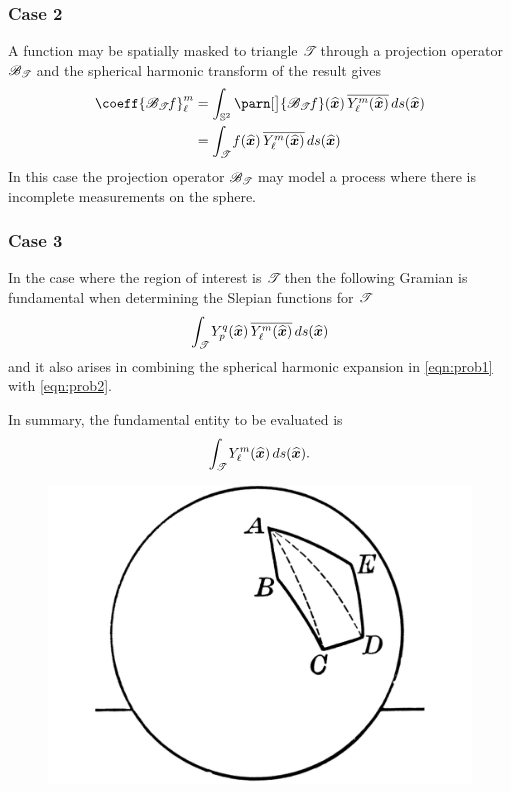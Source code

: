 \documentclass[10pt, twocolumn, twoside]{IEEEtran}
\newcommand{\untsph}{\mathbb{S}^{2}} %
\newcommand{\unit}[1]{\widehat{\bm{#1}}}
\newcommand{\conj}[1]{\overline{#1}} %
\begin{document}
\begin{bibunit}
\subsubsection{Case 2} A function may be spatially masked to triangle $\mathscr{T}\!$ through a projection operator $\mathscr{B}_{\mathscr{T}\!}$ and the spherical harmonic transform of the result gives
\begin{align}
\coeff{\proj_{\T}f}_{\ell}^{m}
&=\int_{\untsph} \parn[\big]{\proj_{\T}f}(\unit{x})\,
\conj{Y_{\ell}^{m}(\unit{x})}\,ds(\unit{x})\nonumber\\
&=\int_{\T} f(\unit{x})\,\conj{Y_{\ell}^{m}(\unit{x})}\,ds(\unit{x})\label{eqn:prob2}
\end{align}
In this case the projection operator $\mathscr{B}_{\mathscr{T}\!}$ may model a process where there is incomplete measurements on the sphere.


\subsubsection{Case 3} In the case where the region of interest is $\mathscr{T}\!$ then the following Gramian is fundamental when determining the Slepian functions for $\mathscr{T}\!$
\begin{equation}
\label{eqn:prob3}
\int_{\T} Y_{p}^{q}(\unit{x})\,\conj{Y_{\ell}^{m}(\unit{x})}\,ds(\unit{x})
\end{equation}
and it also arises in combining the spherical harmonic expansion in \eqref{eqn:prob1} with \eqref{eqn:prob2}.

In summary, the fundamental entity to be evaluated is
\begin{equation}
\label{eqn:prob4}
\int_{\T} Y_{\ell}^{m}(\unit{x})\,ds(\unit{x}).
\end{equation}

\begin{figure}[tb]
\centering
\includegraphics[width=0.8\columnwidth]{pdfs/spherepoly.pdf}
\end{figure}


\end{bibunit}
\end{document}

